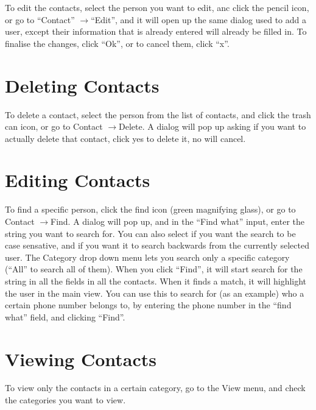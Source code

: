 \documentclass[12pt,letterpaper,oneside, openany]{book} \usepackage[latin1] {inputenc}
\begin{document}
To edit the contacts, select the person you want to edit, anc click the pencil icon, or go to ``Contact'' \begin{math}\rightarrow\end{math}``Edit'', and it will open up the same dialog used to add a user, except their information that is already entered will already be filled in. To finalise the changes, click ``Ok'', or to cancel them, click ``x''. 

\section{Deleting Contacts}

To delete a contact, select the person from the list of contacts, and click the trash can icon, or go to Contact \begin{math}\rightarrow\end{math}Delete. A dialog will pop up asking if you want to actually delete that contact, click yes to delete it, no will cancel. 

\section{Editing Contacts}

To find a specific person, click the find icon (green magnifying glass), or go to Contact \begin{math}\rightarrow\end{math}Find. A dialog will pop up, and in the ``Find what'' input, enter the string you want to search for. You can also select if you want the search to be case sensative, and if you want it to search backwards from the currently selected user. The Category drop down menu lets you search only a specific category (``All'' to search all of them). When you click ``Find'', it will start search for the string in all the fields in all the contacts. When it finds a match, it will highlight the user in the main view. You can use this to search for (as an example) who a certain phone number belongs to, by entering the phone number in the ``find what'' field, and clicking ``Find''. 

\section{Viewing Contacts}

To view only the contacts in a certain category, go to the View menu, and check the categories you want to view. 
\end{document}
